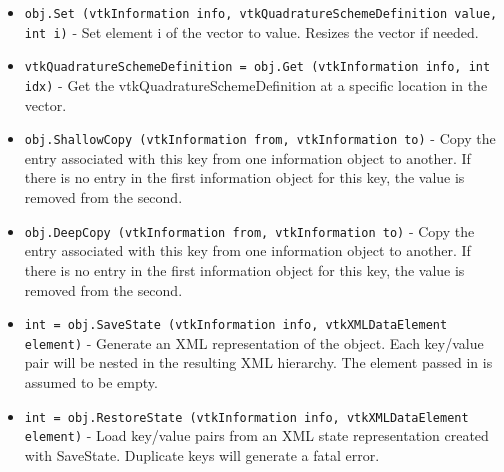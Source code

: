\begin{itemize}
\item  \verb|obj.Set (vtkInformation info, vtkQuadratureSchemeDefinition value, int i)| -  Set element i of the vector to value. Resizes the vector
 if needed.

\item  \verb|vtkQuadratureSchemeDefinition = obj.Get (vtkInformation info, int idx)| -  Get the vtkQuadratureSchemeDefinition at a specific location in the vector.

\item  \verb|obj.ShallowCopy (vtkInformation from, vtkInformation to)| -  Copy the entry associated with this key from one information
 object to another.  If there is no entry in the first information
 object for this key, the value is removed from the second.

\item  \verb|obj.DeepCopy (vtkInformation from, vtkInformation to)| -  Copy the entry associated with this key from one information
 object to another.  If there is no entry in the first information
 object for this key, the value is removed from the second.

\item  \verb|int = obj.SaveState (vtkInformation info, vtkXMLDataElement element)| -  Generate an XML representation of the object. Each
 key/value pair will be nested in the resulting XML hierarchy.
 The element passed in is assumed to be empty.

\item  \verb|int = obj.RestoreState (vtkInformation info, vtkXMLDataElement element)| -  Load key/value pairs from an XML state representation created
 with SaveState. Duplicate keys will generate a fatal error.

\end{itemize}

